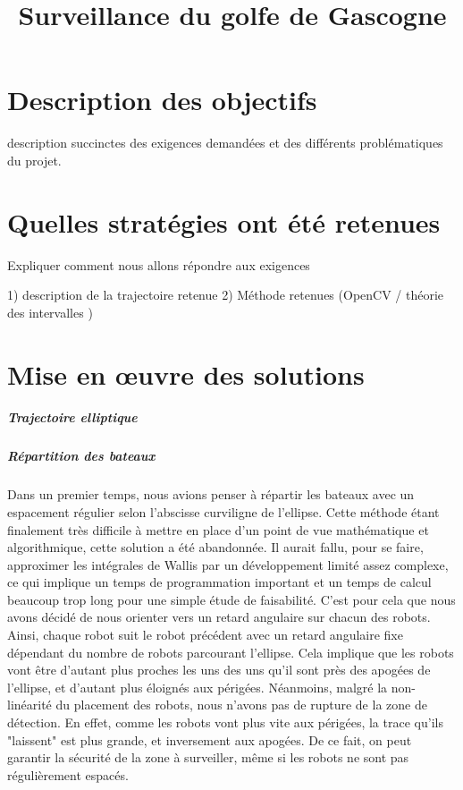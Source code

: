 \documentclass[10pt,a4paper]{report}
\begin{document}
\title{\textbf{ {\Huge Surveillance du golfe de Gascogne}}}

\maketitle

\pagebreak

\chapter{Description des objectifs }

description succinctes des exigences demandées et des différents problématiques du projet.


\chapter{Quelles stratégies ont été retenues}

Expliquer comment nous allons répondre aux exigences

1) description de la trajectoire retenue
2) Méthode retenues (OpenCV / théorie des intervalles )


\chapter{Mise en œuvre des solutions}

\paragraph{Trajectoire elliptique}

\paragraph{Répartition des bateaux}
Dans un premier temps, nous avions penser à répartir les bateaux avec un espacement régulier selon l'abscisse curviligne de l'ellipse.
Cette méthode étant finalement très difficile à mettre en place d'un point de vue mathématique et algorithmique, cette solution a été abandonnée. Il aurait fallu, pour se faire, approximer les intégrales de Wallis par un développement limité assez complexe, ce qui implique un temps de programmation important et un temps de calcul beaucoup trop long pour une simple étude de faisabilité.
C'est pour cela que nous avons décidé de nous orienter vers un retard angulaire sur chacun des robots. Ainsi, chaque robot suit le robot précédent avec un retard angulaire fixe dépendant du nombre de robots parcourant l'ellipse. Cela implique que les robots vont être d'autant plus proches les uns des uns qu'il sont près des apogées de l'ellipse, et d'autant plus éloignés aux périgées.
Néanmoins, malgré la non-linéarité du placement des robots, nous n'avons pas de rupture de la zone de détection. En effet, comme les robots vont plus vite aux périgées, la trace qu'ils "laissent" est plus grande, et inversement aux apogées. De ce fait, on peut garantir la sécurité de la zone à surveiller, même si les robots ne sont pas régulièrement espacés.
\end{document}

